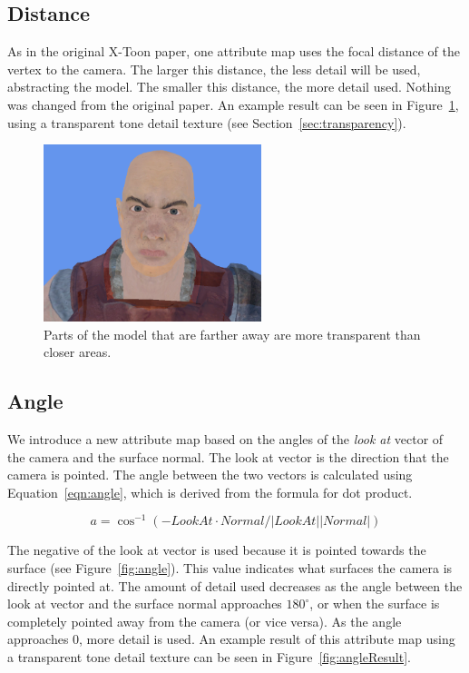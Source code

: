 \documentclass[annual]{acmsiggraph}
\begin{document}
\subsection{Distance}
\label{sec:distance}
As in the original X-Toon paper, one attribute map uses the focal distance of the vertex to the camera. The larger this distance, the less detail will be used, abstracting the model. The smaller this distance, the more detail used. Nothing was changed from the original paper. An example result can be seen in Figure~\ref{fig:distanceResult}, using a transparent tone detail texture (see Section~\ref{sec:transparency}).

\begin{figure}[h]
	\centering
	\includegraphics[width=2.5in]{images/distance_result}
	\caption{Parts of the model that are farther away are more transparent than closer areas.}
	\label{fig:distanceResult}
\end{figure}

\subsection{Angle}
\label{sec:angle}
We introduce a new attribute map based on the angles of the {\it{look at}} vector of the camera and the surface normal. The look at vector is the direction that the camera is pointed. The angle between the two vectors is calculated using Equation~\ref{eqn:angle}, which is derived from the formula for dot product.

\begin{equation}
\label{eqn:angle}
a = \cos^{-1}{(-LookAt \cdot Normal / |LookAt||Normal|)}
\end{equation}

The negative of the look at vector is used because it is pointed towards the surface (see Figure~\ref{fig:angle}). This value indicates what surfaces the camera is directly pointed at. The amount of detail used decreases as the angle between the look at vector and the surface normal approaches $180^\circ$, or when the surface is completely pointed away from the camera (or vice versa). As the angle approaches 0, more detail is used. An example result of this attribute map using a transparent tone detail texture can be seen in Figure~\ref{fig:angleResult}.
\end{document}
